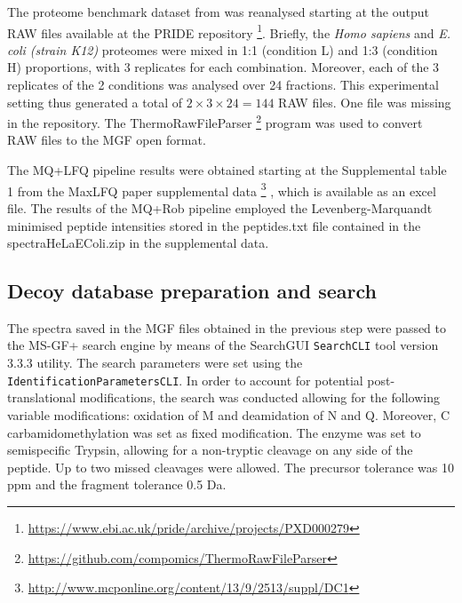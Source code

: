 The proteome benchmark dataset from \cite{Cox2014} was reanalysed starting at the output RAW files available at the PRIDE repository \footnote{\href{https://www.ebi.ac.uk/pride/archive/projects/PXD000279}{https://www.ebi.ac.uk/pride/archive/projects/PXD000279}}. Briefly, the \textit{Homo sapiens} and \textit{E. coli (strain K12)} proteomes were mixed in 1:1 (condition L) and 1:3 (condition H) proportions, with 3 replicates for each combination. Moreover, each of the 3 replicates of the 2 conditions was analysed over 24 fractions. This experimental setting thus generated a total of $2 \times 3 \times 24=144$ RAW files. One file was missing in the repository. The ThermoRawFileParser \footnote{\href{https://github.com/compomics/ThermoRawFileParser}{https://github.com/compomics/ThermoRawFileParser}} program was used to convert RAW files to the MGF open format.

The MQ+LFQ pipeline results were obtained starting at the Supplemental table 1 from the MaxLFQ paper supplemental data \footnote{\href{http://www.mcponline.org/content/13/9/2513/suppl/DC1}{http://www.mcponline.org/content/13/9/2513/suppl/DC1}} \cite{Cox2014}, which is available as an excel file. The results of the MQ+Rob pipeline employed the Levenberg-Marquandt minimised peptide intensities stored in the peptides.txt file contained in the spectraHeLaEColi.zip in the supplemental data.


\subsection{Decoy database preparation and search}
\label{subsec:database_preparation}

The spectra saved in the MGF files obtained in the previous step were passed to the MS-GF+ search engine \cite{Kim2014} by means of the SearchGUI \texttt{SearchCLI} tool version 3.3.3 \cite{Barsnes2018} utility. The search parameters were set using the \texttt{IdentificationParametersCLI}. In order to account for potential post-translational modifications, the search was conducted allowing for the following variable modifications: oxidation of M and deamidation of N and Q. Moreover, C carbamidomethylation was set as fixed modification. The enzyme was set to semispecific Trypsin, allowing for a non-tryptic cleavage on any side of the peptide. Up to two missed cleavages were allowed. The precursor tolerance was 10 ppm and the fragment tolerance 0.5 Da. 


